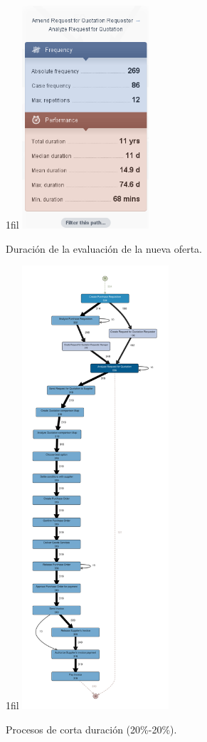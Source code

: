 \documentclass[13pt,a4paper]{article}
\makeatletter
\newcommand*{\centerfloat}{%
  \parindent \z@
  \leftskip \z@ \@plus 1fil \@minus \textwidth
  \rightskip\leftskip
  \parfillskip \z@skip}
\makeatother
\begin{document}
\begin{figure}[h]
  \centerfloat
  \includegraphics[width=0.42\textwidth]{img/1.png}
  \caption{Duración de la evaluación de la nueva oferta.}
\end{figure}

\newpage

\begin{figure}[t]
  \centerfloat
  \includegraphics[width=0.485\textwidth]{img/shortDuration_20_20.pdf}
  \caption{Procesos de corta duración (20\%-20\%).}
\end{figure}
\end{document}
